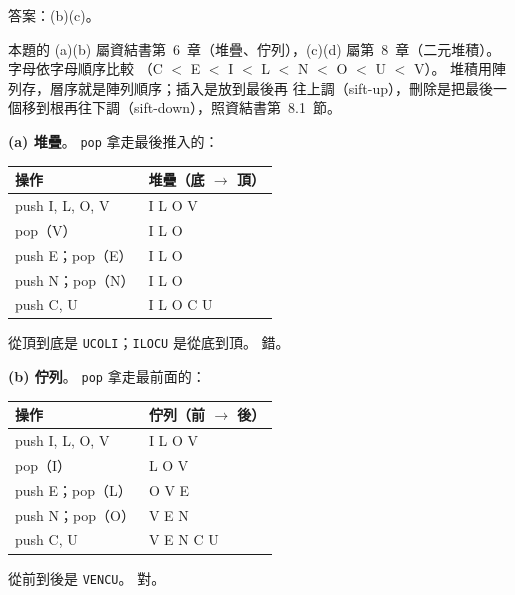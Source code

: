 \begin{pastsoln}
答案：(b)(c)。

本題的 (a)(b) 屬資結書第~6~章（堆疊、佇列），(c)(d) 屬第~8~章（二元堆積）。 字母依字母順序比較
（C $<$ E $<$ I $<$ L $<$ N $<$ O $<$ U $<$ V）。 堆積用陣列存，層序就是陣列順序；插入是放到最後再
往上調（sift-up），刪除是把最後一個移到根再往下調（sift-down），照資結書第~8.1~節。

\textbf{(a) 堆疊}。 \texttt{pop} 拿走最後推入的：
\begin{center}
\small
\begin{tabular}{ll}
\toprule
操作 & 堆疊（底 $\to$ 頂） \\
\midrule
push I, L, O, V & I L O V \\
pop（V） & I L O \\
push E；pop（E） & I L O \\
push N；pop（N） & I L O \\
push C, U & I L O C U \\
\bottomrule
\end{tabular}
\end{center}
從頂到底是 \texttt{UCOLI}；\texttt{ILOCU} 是從底到頂。 錯。

\textbf{(b) 佇列}。 \texttt{pop} 拿走最前面的：
\begin{center}
\small
\begin{tabular}{ll}
\toprule
操作 & 佇列（前 $\to$ 後） \\
\midrule
push I, L, O, V & I L O V \\
pop（I） & L O V \\
push E；pop（L） & O V E \\
push N；pop（O） & V E N \\
push C, U & V E N C U \\
\bottomrule
\end{tabular}
\end{center}
從前到後是 \texttt{VENCU}。 對。


\end{pastsoln}
